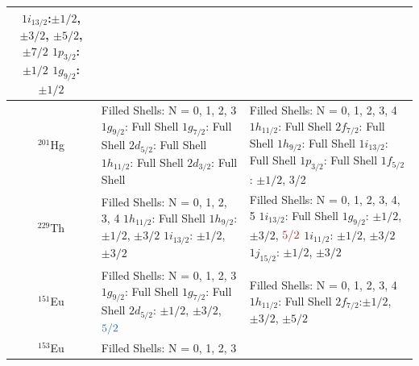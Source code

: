 \documentclass[10pt,a4paper, twoside, openright]{report}
\begin{document}
\begin{longtable}{cll}
{    $1i_{13/2}$:$\pm 1/2$, $\pm 3/2$, $\pm 5/2$, $\pm 7/2$ \\
    $1p_{3/2}$: $\pm 1/2$ \\
    $1g_{9/2}$: $\pm 1/2$} \\
\midrule
$^{201}$Hg 
    &  \pbox{20cm}{Filled Shells: N = 0, 1, 2, 3 \\
    $1g_{9/2}$: Full Shell \\
    $1g_{7/2}$: Full Shell \\
    $2d_{5/2}$: Full Shell \\
    $1h_{11/2}$: Full Shell \\
    $2d_{3/2}$: Full Shell}              
    &  \pbox{20cm}{Filled Shells: N = 0, 1, 2, 3, 4 \\
    $1h_{11/2}$: Full Shell \\
    $2f_{7/2}$: Full Shell \\
    $1h_{9/2}$: Full Shell \\
    $1i_{13/2}$: Full Shell \\
    $1p_{3/2}$: Full Shell \\
    $1f_{5/2}$: $\pm 1/2$, \textcolor{BrickRed}{3/2}} \\
\midrule
$^{229}$Th 
    &  \pbox{20cm}{Filled Shells: N = 0, 1, 2, 3, 4 \\
    $1h_{11/2}$: Full Shell \\
    $1h_{9/2}$: $\pm 1/2$, $\pm 3/2$ \\
    $1i_{13/2}$: $\pm 1/2$, $\pm 3/2$}              
    &  \pbox{20cm}{Filled Shells: N = 0, 1, 2, 3, 4, 5 \\
    $1i_{13/2}$: Full Shell \\
    $1g_{9/2}$: $\pm 1/2$, $\pm 3/2$, $\textcolor{BrickRed}{5/2}$ \\
    $1i_{11/2}$: $\pm 1/2$, $\pm 3/2$ \\
    $1j_{15/2}$: $\pm 1/2$, $\pm 3/2$} \\
\midrule
$^{151}$Eu 
    &  \pbox{20cm}{Filled Shells: N = 0, 1, 2, 3 \\
    $1g_{9/2}$: Full Shell \\
    $1g_{7/2}$: Full Shell \\
    $2d_{5/2}$: $\pm 1/2$, $\pm 3/2$, $\textcolor{RoyalBlue}{5/2}$ }          
    &  \pbox{20cm}{Filled Shells: N = 0, 1, 2, 3, 4 \\
    $1h_{11/2}$: Full Shell \\
    $2f_{7/2}$:$\pm 1/2$, $\pm 3/2$, $\pm 5/2$} \\
\midrule
$^{153}$Eu 
    &  \pbox{20cm}{Filled Shells: N = 0, 1, 2, 3 \\
}
\end{longtable}
\end{document}
